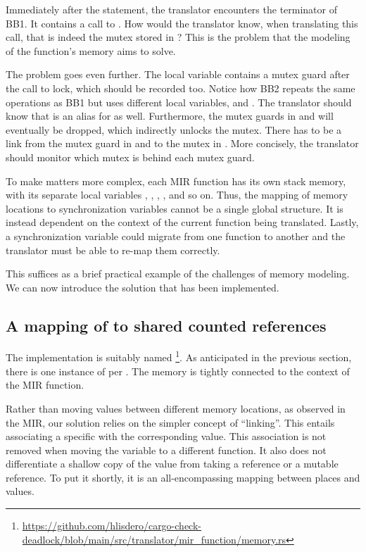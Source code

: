 Immediately after the statement, the translator encounters the terminator of BB1.
It contains a call to .
How would the translator know, when translating this call,
that  is indeed the mutex stored in ?
This is the problem that the modeling of the function's memory aims to solve.

The problem goes even further.
The local variable  contains a mutex guard after the call to lock,
which should be recorded too.
Notice how BB2 repeats the same operations as BB1 but uses different local variables,
 and .
The translator should know that  is an alias for  as well.
Furthermore, the mutex guards in  and  will eventually be dropped,
which indirectly unlocks the mutex.
There has to be a link from the mutex guard in  and 
to the mutex in .
More concisely, the translator should monitor which mutex is behind each mutex guard.

To make matters more complex, each \acrshort{MIR} function has its own stack memory,
with its separate local variables , ,
, , and so on.
Thus, the mapping of memory locations to synchronization variables
cannot be a single global structure.
It is instead dependent on the context of the current function being translated.
Lastly, a synchronization variable could migrate from one function to another
and the translator must be able to re-map them correctly.

This suffices as a brief practical example of the challenges of memory modeling.
We can now introduce the solution that has been implemented.

\subsection{A mapping of  to shared counted references}

The implementation is suitably named
\footnote{\url{https://github.com/hlisdero/cargo-check-deadlock/blob/main/src/translator/mir_function/memory.rs}}.
As anticipated in the previous section,
there is one instance of  per .
The memory is tightly connected to the context of the \acrshort{MIR} function.

Rather than moving values between different memory locations,
as observed in the \acrshort{MIR},
our solution relies on the simpler concept of ``linking''.
This entails associating a specific 
with the corresponding value.
This association is not removed when moving the variable to a different function.
It also does not differentiate a shallow copy of the value
from taking a reference or a mutable reference.
To put it shortly, it is an all-encompassing mapping between places and values.

